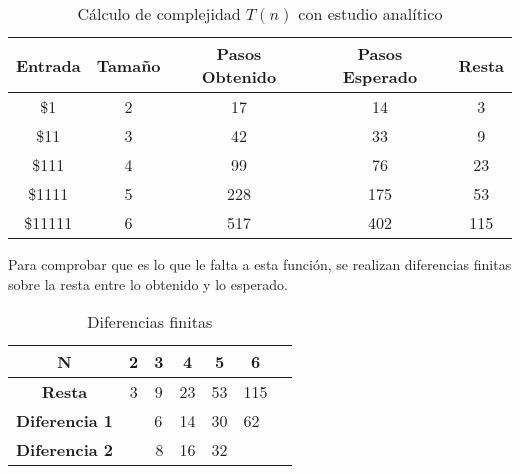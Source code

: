 \documentclass{uc3mpracticas}
\begin{document}
    \begin{table}[!h]
      \centering
    \begin{tabular}{|c|c|c|c|c|}
    \hline
    \textbf{Entrada} & \textbf{Tamaño} & \textbf{Pasos Obtenido} & \textbf{Pasos Esperado} & \textbf{Resta}\\ \hline
    \$1              & 2               & 17                      & 14                        &  3             \\ \hline
    \$11             & 3               & 42                      & 33                        &  9             \\ \hline
    \$111            & 4               & 99                      & 76                        &  23             \\ \hline
    \$1111           & 5               & 228                     & 175                       &  53           \\ \hline
    \$11111          & 6               & 517                     & 402                       &  115         \\ \hline
    \end{tabular}
    \caption{Cálculo de complejidad $T(n)$ con estudio analítico}
    \end{table}


    Para comprobar que es lo que le falta a esta función, se realizan diferencias finitas sobre la resta entre lo obtenido y lo esperado.



    \begin{table}[!h]
      \centering
    \begin{tabular}{|c|p{1cm}|p{1cm}|p{1cm}|p{1cm}|p{1cm}|p{1cm}|}
    \hline
    \textbf{N}     & \multicolumn{1}{c|}{\textbf{2}} & \multicolumn{1}{c|}{\textbf{3}} & \multicolumn{1}{c|}{\textbf{4}} & \multicolumn{1}{c|}{\textbf{5}} & \multicolumn{1}{c|}{\textbf{6}} \\ \hline
    \textbf{Resta} & \multicolumn{1}{c|}{3}& \multicolumn{1}{c|}{9}& \multicolumn{1}{c|}{23}& \multicolumn{1}{c|}{53}& \multicolumn{1}{c|}{115} \\ \hline
    \textbf{Diferencia 1}& & 6& 14& 30& 62\\ \hline
    \textbf{Diferencia 2} & &\multicolumn{1}{r|}{8} &\multicolumn{1}{r|}{16} &\multicolumn{1}{r|}{32} & \\ \hline
    \end{tabular}
    \caption{Diferencias finitas}
    \end{table}
\end{document}
